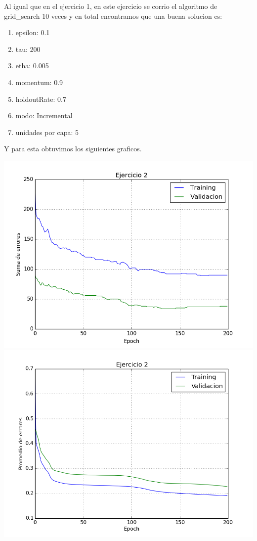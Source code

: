 Al igual que en el ejercicio 1, en este ejercicio se corrio el algoritmo de grid\_search 10 veces y en total encontramos que una buena solucion es:

\begin{enumerate}
\item epsilon: 0.1
\item tau: 200
\item etha: 0.005
\item momentum: 0.9
\item holdoutRate: 0.7
\item modo: Incremental
\item unidades por capa: 5
\end{enumerate}

Y para esta obtuvimos los siguientes graficos.

\includegraphics[scale=0.4]{img/ej200050915sum}
\includegraphics[scale=0.4]{img/ej200050915mean}

